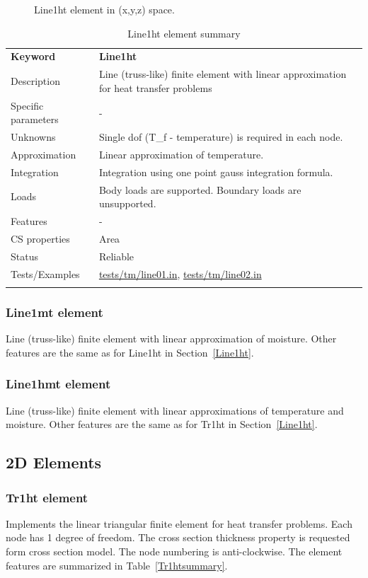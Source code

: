 \documentclass[a4paper]{article}
\newcommand{\param}[1]{\texttt{#1}} %
\newcommand{\templabel}{}%
\newcommand{\tempcaption}{}%
\newcounter{nelpar}
\newenvironment{elementsummary}[5]{%
  \gdef\tempcaption{#4}%
  \gdef\templabel{#5}%
  \setcounter{nelpar}{0}%
  \begin{center} %
    \begin{table}[!htb] %
      \begin{tabular}{|l|p{9cm}|}\hline %
        {\bf Keyword} & \bf{#1}\\ %
        {Description} & {#2}\\ %
        {Specific parameters} & {#3}\\ \hline %
}{
  \\ \hline %
      \end{tabular}%
      \caption{\tempcaption}%
      \label{\templabel}%
    \end{table}%
  \end{center}%
}
\newcommand{\elementParam}[1]{%
  \ifthenelse{\value{nelpar}>0} %
             {&{#1}}%
             {\setcounter{nelpar}{1}Parameters&{#1}}%
             \\%
}
\newcommand{\elementDescription}[2]{{#1} & {#2}\\}
\begin{document}
\begin{figure}[htb]
 \centering
 \begin{makeimage}
  
 \end{makeimage}
 \caption{Line1ht element in (x,y,z) space.}
\end{figure}

\begin{elementsummary}{Line1ht}{Line (truss-like) finite element with linear approximation for heat transfer problems}{-}{Line1ht element summary}{Line1htsummary}
\elementDescription{Unknowns}{Single dof (T\_f - temperature) is required in each node.}
\elementDescription{Approximation}{Linear approximation of temperature.}
\elementDescription{Integration}{Integration using one point gauss integration formula.}
\elementDescription{Loads}{Body loads are supported. Boundary loads are unsupported.}
\elementDescription{Features}{-}
\elementDescription{CS properties}{Area}
\elementDescription{Status}{Reliable}
\elementDescription{Tests/Examples}{\href{https://github.com/oofem/oofem/blob/devel/tests/tm/line01.in}{tests/tm/line01.in},
  \href{https://github.com/oofem/oofem/blob/devel/tests/tm/line02.in}{tests/tm/line02.in}
}
\end{elementsummary}

\subsubsection{Line1mt element}
Line (truss-like) finite element with linear approximation of moisture.
Other features are the same as for Line1ht in Section~\ref{Line1ht}.

\subsubsection{Line1hmt element}
Line (truss-like) finite element with linear approximations of temperature and moisture. 
Other features are the same as for Tr1ht in Section~\ref{Line1ht}.




\subsection{2D Elements}
\subsubsection{Tr1ht element}
\label{Tr1ht}
Implements the linear triangular finite element for heat transfer problems. Each node has 1 degree of freedom.
The cross section thickness property is requested form cross section model.
The node numbering is anti-clockwise. The element features are summarized in Table~\ref{Tr1htsummary}.
\end{document}
